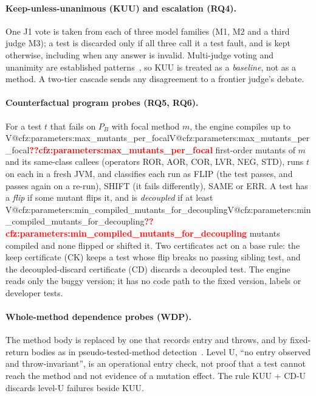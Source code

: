 \documentclass[journal]{IEEEtran}
\makeatletter
\newcommand{\V}[1]{\ifcsname V@#1\endcsname\csname V@#1\endcsname\else\textbf{\textcolor{red}{??#1}}\fi}
\makeatother
\begin{document}
\paragraph{Keep-unless-unanimous (KUU) and escalation (RQ4).} One J1 vote is taken from each of three model families (M1, M2 and a third judge M3); a test is discarded only if all three call it a test fault, and is kept otherwise, including when any answer is invalid. Multi-judge voting and unanimity are established patterns~\cite{wang2025json,becker2026jit,zhang2026testagent}, so KUU is treated as a \emph{baseline}, not as a method. A two-tier cascade sends any disagreement to a frontier judge's debate.

\paragraph{Counterfactual program probes (RQ5, RQ6).} For a test $t$ that fails on $P_B$ with focal method $m$, the engine compiles up to \V{cfz:parameters:max_mutants_per_focal} first-order mutants of $m$ and its same-class callees (operators ROR, AOR, COR, LVR, NEG, STD), runs $t$ on each in a fresh JVM, and classifies each run as FLIP (the test passes, and passes again on a re-run), SHIFT (it fails differently), SAME or ERR. A test has a \emph{flip} if some mutant flips it, and is \emph{decoupled} if at least \V{cfz:parameters:min_compiled_mutants_for_decoupling} mutants compiled and none flipped or shifted it. Two certificates act on a base rule: the keep certificate (CK) keeps a test whose flip breaks no passing sibling test, and the decoupled-discard certificate (CD) discards a decoupled test. The engine reads only the buggy version; it has no code path to the fixed version, labels or developer tests.

\paragraph{Whole-method dependence probes (WDP).} The method body is replaced by one that records entry and throws, and by fixed-return bodies as in pseudo-tested-method detection~\cite{niedermayr2016will,vera2018pseudo}. Level U, ``no entry observed and throw-invariant'', is an operational entry check, not proof that a test cannot reach the method and not evidence of a mutation effect. The rule KUU + CD-U discards level-U failures beside KUU.
\end{document}
